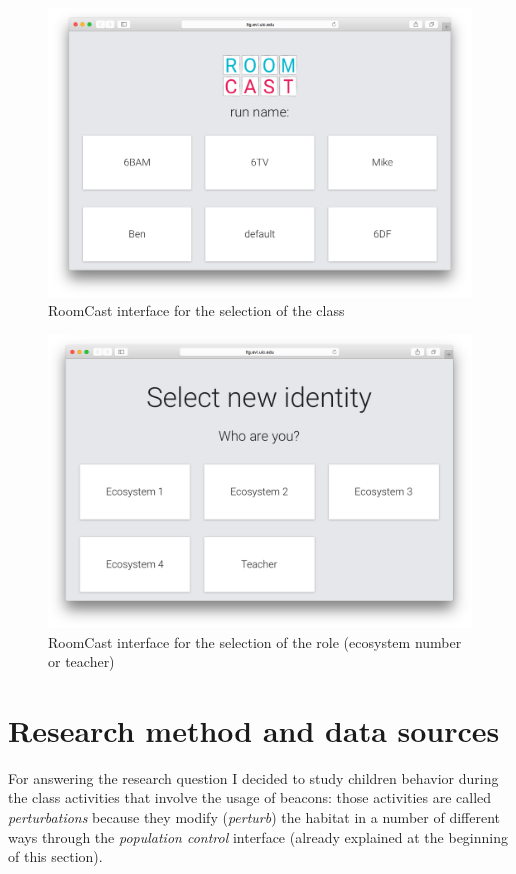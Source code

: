 \begin{figure}
\centering
\includegraphics[width=4.5in]{images/room-cast-classroom-selection.png}
\caption{RoomCast interface for the selection of the class}
\label{fig:roomcast_classroom}
\end{figure}

\begin{figure}
\centering
\includegraphics[width=4.5in]{images/room-cast-habitat-selection.png}
\caption{RoomCast interface for the selection of the role (ecosystem number or teacher)}
\label{fig:roomcast_role}
\end{figure}

\section{Research method and data sources}
For answering the research question I decided to study children behavior during the class activities that involve the usage of beacons: those activities are called \textit{perturbations} because they modify (\textit{perturb}) the habitat in a number of different ways through the \textit{population control} interface (already explained at the beginning of this section).


